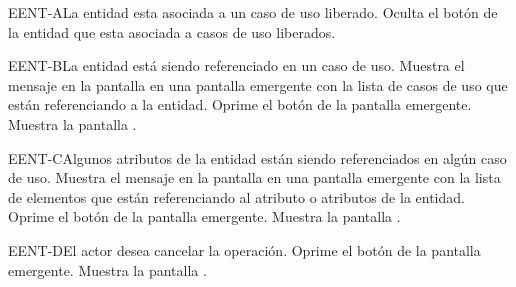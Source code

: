 	\begin{UCtrayectoriaA}{EENT-A}{La entidad esta asociada a un caso de uso liberado.}
		\UCpaso[\UCsist] Oculta el botón \eliminar de la entidad que esta asociada a casos de uso liberados.
	\end{UCtrayectoriaA}

	\begin{UCtrayectoriaA}{EENT-B}{La entidad está siendo referenciado en un caso de uso.}
		\UCpaso[\UCsist] Muestra el mensaje  en la pantalla  en una pantalla emergente con la lista de casos de uso que están referenciando a la entidad.
		\UCpaso[\UCactor] Oprime el botón  de la pantalla emergente.
		\UCpaso[\UCsist] Muestra la pantalla .
	\end{UCtrayectoriaA}

	\begin{UCtrayectoriaA}{EENT-C}{Algunos atributos de la entidad están siendo referenciados en algún caso de uso.}
		\UCpaso[\UCsist] Muestra el mensaje  en la pantalla  en una pantalla emergente con la lista de elementos que están referenciando al atributo o atributos de la entidad.
		\UCpaso[\UCactor] Oprime el botón  de la pantalla emergente.
		\UCpaso[\UCsist] Muestra la pantalla .
	\end{UCtrayectoriaA}

	\begin{UCtrayectoriaA}{EENT-D}{El actor desea cancelar la operación.}
		\UCpaso[\UCactor] Oprime el botón  de la pantalla emergente.
		\UCpaso[\UCsist] Muestra la pantalla .
	\end{UCtrayectoriaA}
	


